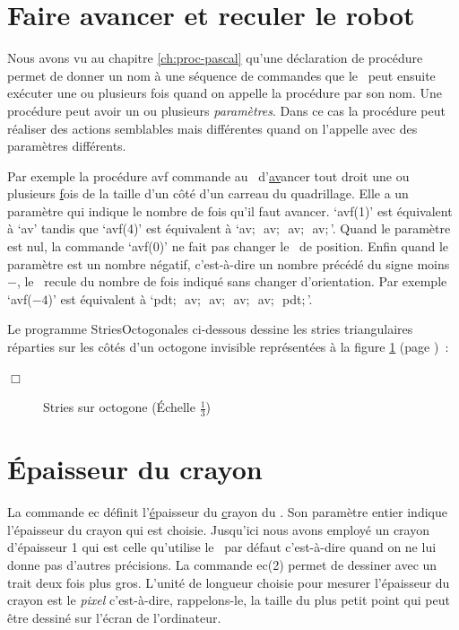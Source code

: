 \section{Faire avancer et reculer le robot}

Nous avons vu au chapitre \ref{ch:proc-pascal} qu'une déclaration de 
procédure permet de donner un nom à une séquence de commandes que le 
\robot\ peut ensuite exécuter une ou plusieurs fois quand on appelle la procédure par son  nom.
Une procédure peut avoir un ou plusieurs {\em paramètres}.  Dans ce cas la procédure
peut réaliser des actions semblables mais différentes quand on l'appelle avec des paramètres
différents.

Par exemple la procédure
 {\idt avf} commande au \robot\ d'\underline{av}ancer tout droit une
ou plusieurs \underline{f}ois de la taille d'un côté d'un carreau du quadrillage.
Elle a un paramètre qui indique le nombre de fois qu'il faut avancer.
`{\idt avf(1)}' est équivalent à `{\idt av}' tandis que
`{\idt avf(4)}' est équivalent à `{\idt av$;$\ av$;$\ av$;$\ av$;$}'.
Quand le paramètre est nul, la commande `{\idt avf(0)}' ne fait pas changer le \robot\ de position.
Enfin quand le paramètre est un nombre négatif, c'est-à-dire un nombre précédé du
signe moins $-$, le \robot\ recule du nombre de fois indiqué sans changer d'orientation. Par exemple
`{\idt avf($-4$)}' est équivalent à `{\idt pdt$;$\ av$;$\ av$;$\ av$;$\ av$;$\ pdt$;$}'.

\begin{exemple}{\rm
 Le programme {\idt StriesOctogonales} ci-dessous dessine les stries triangulaires réparties
 sur les côtés d'un octogone invisible représentées à la figure \ref{fig:stries-oct}
 (page \pageref{fig:stries-oct})~:\hfill
 \pagebreak[3]
 
\noindent $\Box$ }\end{exemple}
\begin{figure}[htbp]
 \caption{Stries sur octogone (Échelle $\frac{1}{3}$)}
 \label{fig:stries-oct}
\end{figure}

\section{Épaisseur du crayon}

La commande {\idt ec}  définit l'\underline{é}paisseur du \underline{c}rayon du \robot. 
Son paramètre entier indique l'épaisseur du crayon
qui  est choisie. Jusqu'ici nous avons employé un crayon d'épaisseur 1 qui est celle qu'utilise
le \robot\ par défaut c'est-à-dire quand on ne lui donne pas d'autres précisions. La
commande {\idt ec(2)} permet de dessiner avec un trait deux fois plus gros. L'unité de
longueur choisie pour mesurer l'épaisseur du crayon est le {\em pixel} c'est-à-dire,
rappelons-le, la
taille du plus petit point qui peut être dessiné sur l'écran de l'ordinateur.

